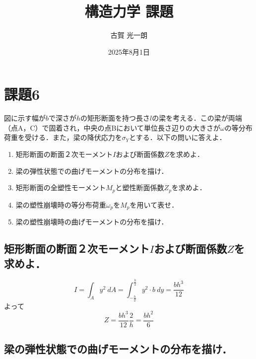 \documentclass[dvipdfmx,a4paper]{jsarticle}
\title{構造力学 課題}
\author{古賀 光一朗}
\date{2025年8月1日}
\begin{document}
\maketitle
\section{課題6}
図に示す幅が$b$で深さが$h$の矩形断面を持つ長さ$l$の梁を考える．この梁が両端（点A，C）で固着され，中央の点Bにおいて単位長さ辺りの大きさが$\omega$の等分布荷重を受ける．また，梁の降伏応力を$\sigma_Y$とする．以下の問いに答えよ．
\begin{enumerate}
    \item 矩形断面の断面２次モーメント$I$および断面係数$Z$を求めよ．
    \item 梁の弾性状態での曲げモーメントの分布を描け．
    \item 矩形断面の全塑性モーメント$M_p$と塑性断面係数$Z_p$を求めよ．
    \item 梁の塑性崩壊時の等分布荷重$\omega_p$を$M_p$を用いて表せ．
    \item 梁の塑性崩壊時の曲げモーメントの分布を描け．
\end{enumerate}

\subsection{矩形断面の断面２次モーメント$I$および断面係数$Z$を求めよ．}

\begin{equation}
    I=\int_A y^2\ dA
    =\int_{-\frac{h}{2}}^{\frac{h}{2}} y^2 \cdot b\ dy=\frac{bh^3}{12}
\end{equation}
よって
\begin{equation}
    Z=\frac{bh^3}{12} \frac{2}{h}=\frac{bh^2}{6}
\end{equation}

\subsection{梁の弾性状態での曲げモーメントの分布を描け．}
\end{document}
